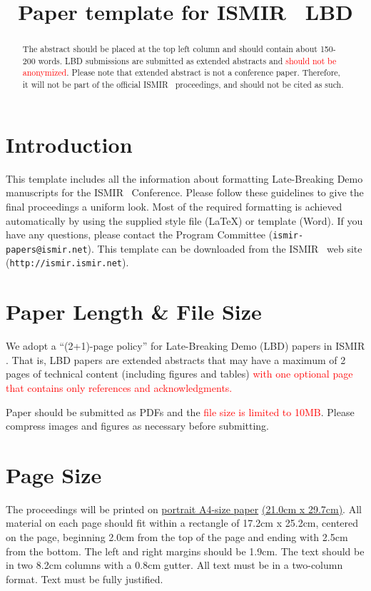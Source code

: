 \documentclass{article}
\title{Paper template for ISMIR \conferenceyear\ LBD}
\begin{document}
%
\maketitle
%
\begin{abstract}
The abstract should be placed at the top left column and should contain about 150-200 words. LBD submissions are submitted as extended abstracts and \textcolor{red}{should not be anonymized}. Please note that extended abstract is not a conference paper. Therefore, it will not be part of the official ISMIR \conferenceyear\ proceedings, and should not be cited as such. 
\end{abstract}
%
\section{Introduction}\label{sec:introduction}

This template includes all the information about formatting Late-Breaking Demo manuscripts for the ISMIR \conferenceyear\ Conference. Please follow these guidelines to give the final proceedings a uniform look. Most of the required formatting is achieved automatically by using the supplied
style file (\LaTeX) or template (Word).
If you have any questions, please contact the Program Committee (\texttt{ismir\conferenceyear-papers@ismir.net}).
This template can be downloaded from the ISMIR \conferenceyear\ web site (\texttt{http://ismir\conferenceyear.ismir.net}).
%
\section{Paper Length \& File Size}
We adopt a ``(2+1)-page policy'' for Late-Breaking Demo (LBD) papers in ISMIR \conferenceyear. That is, LBD papers are extended abstracts that may have a maximum of 2 pages of technical content (including figures and tables) \textcolor{red}{with one optional page that contains only references and acknowledgments.} 

Paper should be submitted as PDFs and the \textcolor{red}{file size is limited to 10MB}. Please compress images and figures as necessary before submitting.

\section{Page Size}\label{sec:page_size}

The proceedings will be printed on
 \underline{portrait A4-size paper} \underline{(21.0cm x 29.7cm)}.
All material on each page should fit within a rectangle of 17.2cm x 25.2cm,
centered on the page, beginning 2.0cm
from the top of the page and ending with 2.5cm from the bottom.
The left and right margins should be 1.9cm.
The text should be in two 8.2cm columns with a 0.8cm gutter.
All text must be in a two-column format.
Text must be fully justified.
\end{document}
